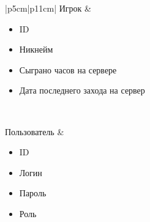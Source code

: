 \begin{table}[H]
\begin{tabular}{|p{5cm}|p{11cm}|}
        Игрок &
            \begin{minipage}[t]{\linewidth}
                \begin{itemize}[nosep,after=\strut]
                    \item ID
                    \item Никнейм
                    \item Сыграно часов на сервере
                    \item Дата последнего захода на сервер
                \end{itemize}
            \end{minipage}
        \\ \hline

        Пользователь &
            \begin{minipage}[t]{\linewidth}
                \begin{itemize}[nosep,after=\strut]
                    \item ID
                    \item Логин
                    \item Пароль
                    \item Роль
                \end{itemize}
            \end{minipage}
        \\ \hline
    \end{tabular}
\end{table}



